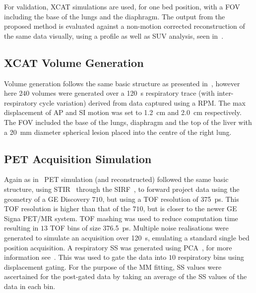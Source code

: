             For validation, \gls{XCAT} simulations are used, for one bed position, with a \gls{FOV} including the base of the lungs and the diaphragm. The output from the proposed method is evaluated against a non-motion corrected reconstruction of the same data visually, using a profile as well as \gls{SUV} analysis, seen in~.
            
            \subsection{XCAT Volume Generation} \label{sec:pet_ct_respiratory_motion_correction_with_a_single_attenuation_map_using_nac_derived_deformation_fields_methods_xcat_volume_generation}
                Volume generation follows the same basic structure as presented in~, however here $240$ volumes were generated over a \SI{120}{\second} respiratory trace (with inter-respiratory cycle variation) derived from data captured using a \gls{RPM}. The max displacement of \gls{AP} and \gls{SI} motion was set to \SI{1.2}{\centi\metre} and \SI{2.0}{\centi\metre} respectively. The \gls{FOV} included the base of the lungs, diaphragm and the top of the liver with a \SI{20}{\milli\metre} diameter spherical lesion placed into the centre of the right lung.
    
            \subsection{PET Acquisition Simulation} \label{sec:pet_ct_respiratory_motion_correction_with_a_single_attenuation_map_using_nac_derived_deformation_fields_methods_pet_acquisition_simulation}
                Again as in~ \gls{PET} simulation (and reconstructed) followed the same basic structure, using \gls{STIR}~\parencite{Thielemans2012, Nikos2019, Wadhwa2021PETLibrary} through the \gls{SIRF}~\parencite{Ovtchinnikov2017}, to forward project data using the geometry of a \gls{GE} Discovery $710$, but using a \gls{TOF} resolution of \SI{375}{\pico\second}. This \gls{TOF} resolution is higher than that of the $710$, but is closer to the newer \gls{GE} Signa \gls{PET}/\gls{MR} system. \gls{TOF} mashing was used to reduce computation time resulting in $13$ \gls{TOF} bins of size \SI{376.5}{\pico\second}. Multiple noise realisations were generated to simulate an acquisition over \SI{120}{\second}, emulating a standard single bed position acquisition. A respiratory \gls{SS} was generated using \gls{PCA}~\parencite{Thielemans2011}, for more information see~. This was used to gate the data into $10$ respiratory bins using displacement gating. For the purpose of the \gls{MM} fitting, \gls{SS} values were ascertained for the post-gated data by taking an average of the \gls{SS} values of the data in each bin.
            
